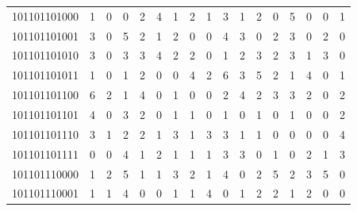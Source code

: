 \documentclass[10pt,a4paper]{article}
\begin{document}
\begin{longtable}{ |c|c|c|c|c|c|c|c|c|c|c|c|c|c|c|c|c| }
    101101101000              & 1                            & 0                                & 0                            & 2                              & 4   & 1   & 2   & 1   & 3   & 1   & 2   & 0   & 5   & 0   & 0   & 1   \\
    101101101001              & 3                            & 0                                & 5                            & 2                              & 1   & 2   & 0   & 0   & 4   & 3   & 0   & 2   & 3   & 0   & 2   & 0   \\
    101101101010              & 3                            & 0                                & 3                            & 3                              & 4   & 2   & 2   & 0   & 1   & 2   & 3   & 2   & 3   & 1   & 3   & 0   \\
    101101101011              & 1                            & 0                                & 1                            & 2                              & 0   & 0   & 4   & 2   & 6   & 3   & 5   & 2   & 1   & 4   & 0   & 1   \\
    101101101100              & 6                            & 2                                & 1                            & 4                              & 0   & 1   & 0   & 0   & 2   & 4   & 2   & 3   & 3   & 2   & 0   & 2   \\
    101101101101              & 4                            & 0                                & 3                            & 2                              & 0   & 1   & 1   & 0   & 1   & 0   & 1   & 0   & 1   & 0   & 0   & 2   \\
    101101101110              & 3                            & 1                                & 2                            & 2                              & 1   & 3   & 1   & 3   & 3   & 1   & 1   & 0   & 0   & 0   & 0   & 4   \\
    101101101111              & 0                            & 0                                & 4                            & 1                              & 2   & 1   & 1   & 1   & 3   & 3   & 0   & 1   & 0   & 2   & 1   & 3   \\
    101101110000              & 1                            & 2                                & 5                            & 1                              & 1   & 3   & 2   & 1   & 4   & 0   & 2   & 5   & 2   & 3   & 5   & 0   \\
    101101110001              & 1                            & 1                                & 4                            & 0                              & 0   & 1   & 1   & 4   & 0   & 1   & 2   & 2   & 1   & 2   & 0   & 0   \\

\end{longtable}
\end{document}
